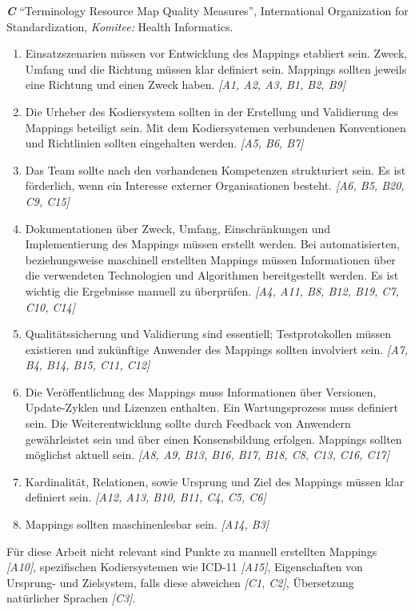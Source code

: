 \textbf{\emph{C}} "`Terminology Resource Map Quality Measures"', International Organization for Standardization, \emph{Komitee:} Health Informatics. \cite{ISO21564}

\vspace{1em}

\begin{enumerate}
\item Einsatzszenarien müssen vor Entwicklung des Mappings etabliert sein. Zweck, Umfang und die Richtung müssen klar definiert sein. Mappings sollten jeweils eine Richtung und einen Zweck haben. \emph{[A1, A2, A3, B1, B2, B9]}
\item Die Urheber des Kodiersystem sollten in der Erstellung und Validierung des Mappings beteiligt sein. Mit dem Kodiersystemen verbundenen Konventionen und Richtlinien sollten eingehalten werden. \emph{[A5, B6, B7]}
\item Das Team sollte nach den vorhandenen Kompetenzen strukturiert sein. Es ist förderlich, wenn ein Interesse externer Organisationen besteht. \emph{[A6, B5, B20, C9, C15]}
\item Dokumentationen über Zweck, Umfang, Einschränkungen und Implementierung des Mappings müssen erstellt werden. Bei automatisierten, beziehungsweise maschinell erstellten Mappings müssen Informationen über die verwendeten Technologien und Algorithmen bereitgestellt werden. Es ist wichtig die Ergebnisse manuell zu überprüfen. \emph{[A4, A11, B8, B12, B19, C7, C10, C14]}
\item Qualitätssicherung und Validierung sind essentiell; Testprotokollen müssen existieren und zukünftige Anwender des Mappings sollten involviert sein. \emph{[A7, B4, B14, B15, C11, C12]}
\item Die Veröffentlichung des Mappings muss Informationen über Versionen, Update-Zyklen und Lizenzen enthalten. Ein Wartungsprozess muss definiert sein. Die Weiterentwicklung sollte durch Feedback von Anwendern gewährleistet sein und über einen Konsensbildung erfolgen. Mappings sollten möglichst aktuell sein. \emph{[A8, A9, B13, B16, B17, B18, C8, C13, C16, C17]}
\item Kardinalität, Relationen, sowie Ursprung und Ziel des Mappings müssen klar definiert sein. \emph{[A12, A13, B10, B11, C4, C5, C6]}
\item Mappings sollten maschinenlesbar sein. \emph{[A14, B3]}
\end{enumerate}

Für diese Arbeit nicht relevant sind Punkte zu manuell erstellten Mappings \emph{[A10]}, spezifischen Kodiersystemen wie ICD-11 \emph{[A15]}, Eigenschaften von Ursprung- und Zielsystem, falls diese abweichen \emph{[C1, C2]}, Übersetzung natürlicher Sprachen \emph{[C3]}. 


